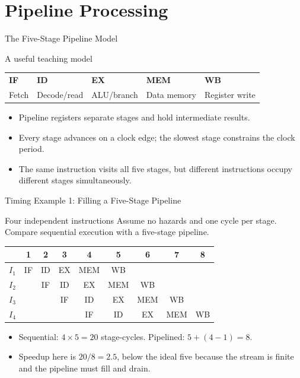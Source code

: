 \documentclass[aspectratio=169]{beamer}
\begin{document}
\section{Pipeline Processing}

\begin{frame}{The Five-Stage Pipeline Model}
  \begin{block}{A useful teaching model}
    \begin{tabular}{@{}lllll@{}}
      \textbf{IF} & \textbf{ID} & \textbf{EX} & \textbf{MEM} & \textbf{WB} \\
      Fetch & Decode/read & ALU/branch & Data memory & Register write
    \end{tabular}
  \end{block}
  \begin{itemize}
    \item Pipeline registers separate stages and hold intermediate results.
    \item Every stage advances on a clock edge; the slowest stage constrains
      the clock period.
    \item The same instruction visits all five stages, but different
      instructions occupy different stages simultaneously.
  \end{itemize}
\end{frame}

\begin{frame}{Timing Example 1: Filling a Five-Stage Pipeline}
  \scriptsize
  \begin{exampleblock}{Four independent instructions}
    Assume no hazards and one cycle per stage. Compare sequential execution
    with a five-stage pipeline.
  \end{exampleblock}
  \begin{center}
    \begin{tabular}{@{}c|cccccccc@{}}
      \toprule
      & 1 & 2 & 3 & 4 & 5 & 6 & 7 & 8 \\
      \midrule
      $I_1$ & IF & ID & EX & MEM & WB & & & \\
      $I_2$ & & IF & ID & EX & MEM & WB & & \\
      $I_3$ & & & IF & ID & EX & MEM & WB & \\
      $I_4$ & & & & IF & ID & EX & MEM & WB \\
      \bottomrule
    \end{tabular}
  \end{center}
  \begin{itemize}
    \item Sequential: $4\times5=20$ stage-cycles. Pipelined: $5+(4-1)=8$.
    \item Speedup here is $20/8=2.5$, below the ideal five because the stream
      is finite and the pipeline must fill and drain.
  \end{itemize}
\end{frame}
\end{document}

